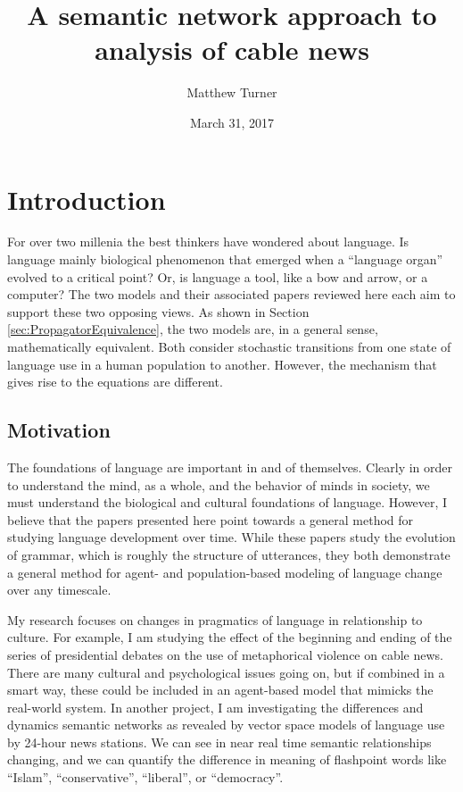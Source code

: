 \documentclass[11pt,letterpaper]{article}
\title{A semantic network approach to analysis of cable news}
\author{Matthew Turner}
\date{March 31, 2017}
\begin{document}
\maketitle


\section{Introduction}
\label{sec:Introduction}

For over two millenia the best thinkers have wondered about language. Is 
language mainly biological phenomenon that emerged when a ``language organ'' 
evolved to a 
critical point? Or, is language a tool, like a bow and arrow, or a computer? 
The two models and their associated papers reviewed here each
aim to support these two opposing views. As shown in Section \ref{sec:PropagatorEquivalence},
the two models are, in a general sense, mathematically equivalent. Both
consider stochastic transitions from one state of language use in a human
population to another. However, the mechanism that gives rise to the equations 
are different. 

\subsection{Motivation}
\label{sub:Motivation}

The foundations of language are important in and of themselves. Clearly in order
to understand the mind, as a whole, and the behavior of minds in society,
we must understand the biological and cultural foundations of language. However,
I believe that the papers presented here point towards a general method for
studying language development over time. While these papers study the evolution 
of grammar, which is roughly the structure of utterances, they both 
demonstrate a general method for agent- and population-based modeling of 
language change over any timescale. 

My research focuses on changes in pragmatics of language in relationship
to culture. For example, I am studying the effect of the beginning and ending
of the series of presidential debates on the use of metaphorical violence on
cable news. There are many cultural and psychological issues going on, but
if combined in a smart way, these could be included in an agent-based model
that mimicks the real-world system. In another project, I am investigating
the differences and dynamics semantic networks as revealed by 
vector space models of language use by 24-hour news stations. We can see in
near real time semantic relationships changing, and we can quantify the difference
in meaning of flashpoint words like ``Islam'', ``conservative'', ``liberal'',
or ``democracy''. 
\end{document}
